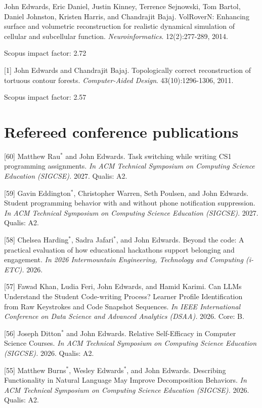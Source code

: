 \documentclass[margin,line]{res}
\newcommand{\pubunder}[1]{#1}
\newcommand{\jnum}[1]{[#1]}
\newcommand{\cnum}[1]{[#1]}
\begin{document}
\begin{resume}
\jnum{2} \pubunder{John Edwards}, Eric Daniel, Justin Kinney, Terrence Sejnowski, Tom Bartol, Daniel Johnston, Kristen Harris, and Chandrajit Bajaj. VolRoverN: Enhancing surface and volumetric reconstruction for realistic dynamical simulation of cellular and subcellular function.  \textit{Neuroinformatics}. 12(2):277-289, 2014.
\begin{IMPACT}
Scopus impact factor: 2.72 %
\end{IMPACT}

\jnum{1} \protect \pubunder{John Edwards} and Chandrajit Bajaj. Topologically correct reconstruction of tortuous contour forests. \textit{Computer-Aided Design}. 43(10):1296-1306, 2011.
\begin{IMPACT}
Scopus impact factor: 2.57 %
\end{IMPACT}


\section{\sc Refereed conference publications}
\cnum{60} Matthew Rau$^*$ and John Edwards. Task switching while writing CS1 programming assignments. \textit{In ACM Technical Symposium on Computing Science Education (SIGCSE).} 2027. Qualis: A2.

\cnum{59} Gavin Eddington$^*$, Christopher Warren, Seth Poulsen, and John Edwards. Student programming behavior with and without phone notification suppression. \textit{In ACM Technical Symposium on Computing Science Education (SIGCSE).} 2027. Qualis: A2.

\cnum{58} Chelsea Harding$^*$, Sadra Jafari$^*$, and John Edwards. Beyond the code: A practical evaluation of how educational hackathons support belonging and engagement. \textit{In 2026 Intermountain Engineering, Technology and Computing (i-ETC).} 2026.

\cnum{57} Fawad Khan, Ludia Feri, John Edwards, and Hamid Karimi. Can LLMs Understand the Student Code-writing Process? Learner Profile Identification from Raw Keystrokes and Code Snapshot Sequences. \textit{In IEEE International Conference on Data Science and Advanced Analytics (DSAA).} 2026. Core: B.

\cnum{56} Joseph Ditton$^*$ and John Edwards. Relative Self-Efficacy in Computer Science Courses. \textit{In ACM Technical Symposium on Computing Science Education (SIGCSE).} 2026. Qualis: A2.

\cnum{55} Matthew Burns$^*$, Wesley Edwards$^*$, and John Edwards. Describing Functionality in Natural Language May Improve Decomposition Behaviors. \textit{In ACM Technical Symposium on Computing Science Education (SIGCSE).} 2026. Qualis: A2.


\end{resume}
\end{document}
